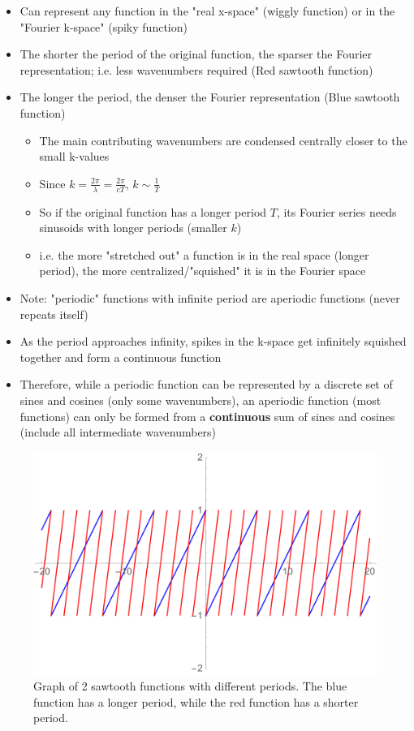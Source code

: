 \documentclass[a4paper,12pt]{article}
\begin{document}
\begin{itemize}
  \item Can represent any function in the "real x-space" (wiggly function) or in the "Fourier k-space" (spiky function)
  \item The shorter the period of the original function, the sparser the Fourier representation; i.e. less wavenumbers required (Red sawtooth function)
  \item The longer the period, the denser the Fourier representation (Blue sawtooth function)
  \begin{itemize}
    \item The main contributing wavenumbers are condensed centrally closer to the small k-values
    \item Since $k = \frac{2\pi}{\lambda} = \frac{2\pi}{c T}$, $k \sim \frac{1}{T}$
    \item So if the original function has a longer period $T$, its Fourier series needs sinusoids with longer periods (smaller $k$)
    \item i.e. the more "stretched out" a function is in the real space (longer period), the more centralized/"squished" it is in the Fourier space
  \end{itemize}
  \item Note: "periodic" functions with infinite period are aperiodic functions (never repeats itself)
  \item As the period approaches infinity, spikes in the k-space get infinitely squished together and form a continuous function
  \item Therefore, while a periodic function can be represented by a discrete set of sines and cosines (only some wavenumbers), an aperiodic function (most functions) can only be formed from a \textbf{continuous} sum of sines and cosines (include all intermediate wavenumbers)
\end{itemize}

\begin{figure}[H]
  \centering
  \includegraphics[width=140mm, scale=0.5]{images/sawtooth-comparison.pdf}
  \caption{Graph of 2 sawtooth functions with different periods. The blue function has a longer period, while the red function has a shorter period.}
  \label{Sawtooth-comparison}
\end{figure}
\end{document}

